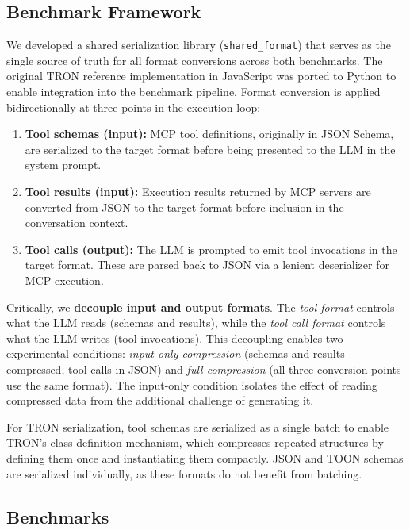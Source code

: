 \documentclass[10pt,twocolumn,letterpaper]{article}
\begin{document}
\subsection{Benchmark Framework}
\label{sec:framework}

We developed a shared serialization library (\texttt{shared\_format}) that serves as the single source of truth for all format conversions across both benchmarks. The original TRON reference implementation in JavaScript \citep{tron-format/tron-javascript_2026} was ported to Python to enable integration into the benchmark pipeline. Format conversion is applied bidirectionally at three points in the execution loop:

\begin{enumerate}
    \item \textbf{Tool schemas (input):} MCP tool definitions, originally in JSON Schema, are serialized to the target format before being presented to the LLM in the system prompt.
    \item \textbf{Tool results (input):} Execution results returned by MCP servers are converted from JSON to the target format before inclusion in the conversation context.
    \item \textbf{Tool calls (output):} The LLM is prompted to emit tool invocations in the target format. These are parsed back to JSON via a lenient deserializer for MCP execution.
\end{enumerate}

Critically, we \textbf{decouple input and output formats}. The \textit{tool format} controls what the LLM reads (schemas and results), while the \textit{tool call format} controls what the LLM writes (tool invocations). This decoupling enables two experimental conditions: \textit{input-only compression} (schemas and results compressed, tool calls in JSON) and \textit{full compression} (all three conversion points use the same format). The input-only condition isolates the effect of reading compressed data from the additional challenge of generating it.

For TRON serialization, tool schemas are serialized as a single batch to enable TRON's class definition mechanism, which compresses repeated structures by defining them once and instantiating them compactly. JSON and TOON schemas are serialized individually, as these formats do not benefit from batching.

\subsection{Benchmarks}
\label{sec:benchmarks}
\end{document}
